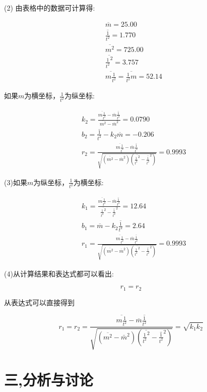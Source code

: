 \documentclass[a4paper,10pt,notitlepage]{report}
\begin{document}
	(2)	由表格中的数据可计算得:

\begin{align}
	&\overline{m} =25.00 \\
	&\overline{\frac{1}{t^2}} =1.770 \\
	&\overline{m^2}=725.00 \\
	&\overline{\frac{1}{t^2}^2} =3.757 \\
	&\overline{m\frac{1}{t^2}}=\overline{\frac{1}{t^2}m}=52.14 
\end{align}
	
	如果$m$为横坐标，$\frac{1}{t^2}$为纵坐标:

\begin{align}
	&k_2=\frac{\overline{m\frac{1}{t^2}}-\overline{m}\overline{\frac{1}{t^2}}}{\overline{m^2}-\overline{m}^2}=0.0790 \\
	&b_2=\overline{\frac{1}{t^2}}-k_2\overline{m}=-0.206 \\
	&r_2=\frac{\overline{m\frac{1}{t^2}}-\overline{m}\overline{\frac{1}{t^2}}}{\sqrt{(\overline{m^2}-\overline{m}^2)(\overline{\frac{1}{t^2}^2}-\overline{\frac{1}{t^2}}^2)}}=0.9993
\end{align}

	(3)如果$m$为纵坐标，$\frac{1}{t^2}$为横坐标:
	
\begin{align}
	&k_1=\frac{\overline{m\frac{1}{t^2}}-\overline{m}\overline{\frac{1}{t^2}}}{\overline{\frac{1}{t^2}^2}-\overline{\frac{1}{t^2}}^2}=12.64 \\
	&b_1=\overline{m}-k_2\overline{\frac{1}{t^2}}=2.64 \\
	&r_1=\frac{\overline{m\frac{1}{t^2}}-\overline{m}\overline{\frac{1}{t^2}}}{\sqrt{(\overline{m^2}-\overline{m}^2)(\overline{\frac{1}{t^2}^2}-\overline{\frac{1}{t^2}}^2)}}=0.9993
\end{align}

	(4)从计算结果和表达式都可以看出:
	
\begin{equation}
	r_1=r_2
\end{equation}

	从表达式可以直接得到

\begin{equation}
	r_1=r_2=\frac{\overline{m\frac{1}{t^2}}-\overline{m}\overline{\frac{1}{t^2}}}{\sqrt{(\overline{m^2}-\bar{m}^2)(\overline{\frac{1}{t^2}^2}-\bar{\frac{1}{t^2}}^2)}}=\sqrt{k_1k_2}
\end{equation}

\section*{三,分析与讨论}
\end{document}
